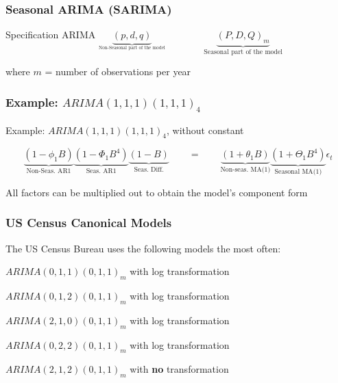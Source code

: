 \documentclass{beamer}
\newenvironment{wideitemize}{\itemize\addtolength{\itemsep}{10pt}}{\enditemize}
\begin{document}
\begin{frame}
  \frametitle{Seasonal ARIMA (SARIMA)}

  \begin{block}{Specification}
    ARIMA  $ \underbrace{(p, d, q)}_{_{\text{Non-Seasonal part of the model}}} \qquad \qquad \underbrace{(P, D, Q)_m}_{\text{Seasonal part of the model}}$
  \end{block}

\medskip
  
where $m$ = number of observations per year
  
\end{frame}


\begin{frame}
  \frametitle{Example: $ARIMA(1,1,1)(1,1,1)_4$}

Example: $ARIMA(1,1,1)(1,1,1)_4$, without constant

\begin{equation*}
  \underbrace{(1-\phi_1B)}_{\text{Non-Seas. AR1}} \underbrace{(1-\Phi_1B^4)}_{\text{Seas. AR1}}\underbrace{(1-B)}_{\text{Seas. Diff.}} \qquad = \qquad \underbrace{(1+\theta_1 B)}_{\text{Non-seas. MA(1)}} \underbrace{(1+\Theta_1 B^4)}_{\text{Seasonal MA(1)}}\epsilon_t
\end{equation*}

\medskip

  All factors can be multiplied out to obtain the model's component form
\end{frame}



\begin{frame}
  \frametitle{US Census Canonical Models}

  The US Census Bureau uses the following models the most often:

  \begin{wideitemize}
  \item $ARIMA(0,1,1)(0,1,1)_m$ with log transformation
  \item $ARIMA(0,1,2)(0,1,1)_m$ with log transformation
  \item $ARIMA(2,1,0)(0,1,1)_m$ with log transformation
  \item $ARIMA(0,2,2)(0,1,1)_m$ with log transformation
  \item $ARIMA(2,1,2)(0,1,1)_m$ with \textbf{no} transformation    
  \end{wideitemize}  
\end{frame}
\end{document}
